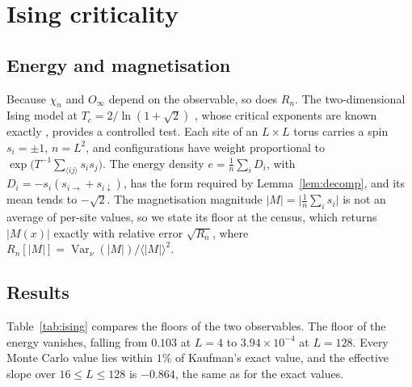 \documentclass[ba,preprint]{imsart}
\theoremstyle{plain}
\theoremstyle{definition}
\newcommand{\Var}{\operatorname{Var}}
\begin{document}
\section{Ising criticality}\label{sec:ising}

\subsection{Energy and magnetisation}

Because $\chi_n$ and $O_\infty$ depend on the observable, so does $R_n$. The two-dimensional Ising model at $T_c=2/\ln(1+\sqrt2)$ \citep{Onsager1944}, whose critical exponents are known exactly \citep{Baxter1982,Yang1952}, provides a controlled test. Each site of an $L\times L$ torus carries a spin $s_i=\pm1$, $n=L^2$, and configurations have weight proportional to $\exp\bigl(T^{-1}\sum_{\langle ij\rangle}s_is_j\bigr)$. The energy density $e=\frac1n\sum_iD_i$, with $D_i=-s_i(s_{i\to}+s_{i\downarrow})$, has the form required by Lemma~\ref{lem:decomp}, and its mean tends to $-\sqrt2$. The magnetisation magnitude $|M|=\bigl|\frac1n\sum_is_i\bigr|$ is not an average of per-site values, so we state its floor at the census, which returns $|M(x)|$ exactly with relative error $\sqrt{R_n}$, where $R_n[|M|]=\Var_\nu(|M|)/\langle|M|\rangle^2$.

\subsection{Results}

Table~\ref{tab:ising} compares the floors of the two observables. The floor of the energy vanishes, falling from $0.103$ at $L=4$ to $3.94\times10^{-4}$ at $L=128$. Every Monte Carlo value lies within $1\%$ of Kaufman's exact value, and the effective slope over $16\le L\le128$ is $-0.864$, the same as for the exact values.
\end{document}
